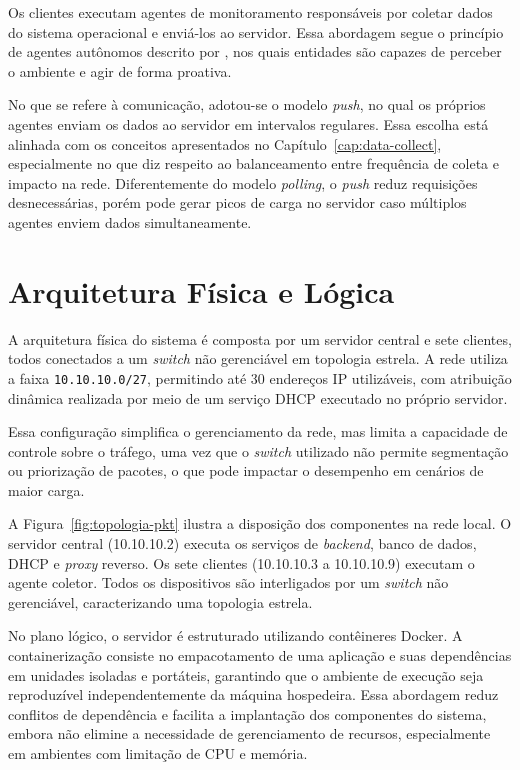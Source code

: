 \documentclass[
    12pt
    ,oneside
    ,a4paper
    ,chapter=TITLE
    ,section=TITLE
    ,sumario=abnt-6027-2012]{abntex2}
\begin{document}
Os clientes executam agentes de monitoramento responsáveis por coletar dados do sistema operacional e enviá-los ao servidor. Essa abordagem segue o princípio de agentes autônomos descrito por , nos quais entidades são capazes de perceber o ambiente e agir de forma proativa.

No que se refere à comunicação, adotou-se o modelo \textit{push}, no qual os próprios agentes enviam os dados ao servidor em intervalos regulares. Essa escolha está alinhada com os conceitos apresentados no Capítulo~\ref{cap:data-collect}, especialmente no que diz respeito ao balanceamento entre frequência de coleta e impacto na rede. Diferentemente do modelo \textit{polling}, o \textit{push} reduz requisições desnecessárias, porém pode gerar picos de carga no servidor caso múltiplos agentes enviem dados simultaneamente.

\section{Arquitetura Física e Lógica}

A arquitetura física do sistema é composta por um servidor central e sete clientes, todos conectados a um \textit{switch} não gerenciável em topologia estrela. A rede utiliza a faixa \texttt{10.10.10.0/27}, permitindo até 30 endereços IP utilizáveis, com atribuição dinâmica realizada por meio de um serviço DHCP executado no próprio servidor.

Essa configuração simplifica o gerenciamento da rede, mas limita a capacidade de controle sobre o tráfego, uma vez que o \textit{switch} utilizado não permite segmentação ou priorização de pacotes, o que pode impactar o desempenho em cenários de maior carga.

A Figura~\ref{fig:topologia-pkt} ilustra a disposição dos componentes na rede local. O servidor central (10.10.10.2) executa os serviços de \textit{backend}, banco de dados, DHCP e \textit{proxy} reverso. Os sete clientes (10.10.10.3 a 10.10.10.9) executam o agente coletor. Todos os dispositivos são interligados por um \textit{switch} não gerenciável, caracterizando uma topologia estrela.

\begin{figure}[htb]
\end{figure}


No plano lógico, o servidor é estruturado utilizando contêineres Docker. A containerização consiste no empacotamento de uma aplicação e suas dependências em unidades isoladas e portáteis, garantindo que o ambiente de execução seja reproduzível independentemente da máquina hospedeira. Essa abordagem reduz conflitos de dependência e facilita a implantação dos componentes do sistema, embora não elimine a necessidade de gerenciamento de recursos, especialmente em ambientes com limitação de CPU e memória.
\end{document}
